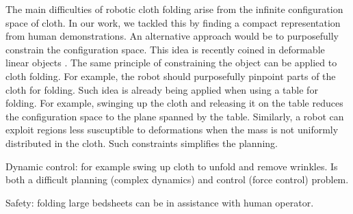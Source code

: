 \documentclass[\home/main.tex]{subfiles}
\begin{document}
The main difficulties of robotic cloth folding arise from the infinite configuration space of cloth. In our work, we tackled this by finding a compact representation from human demonstrations. An alternative approach would be to purposefully constrain the configuration space. This idea is recently coined in deformable linear objects \autocite{Zhu2020}. The same principle of constraining the object can be applied to cloth folding. For example, the robot should purposefully pinpoint parts of the cloth for folding. Such idea is already being applied when using a table for folding. For example, swinging up the cloth and releasing it on the table reduces the configuration space to the plane spanned by the table. Similarly, a robot can exploit regions less suscuptible to deformations when the mass is not uniformly distributed in the cloth. Such constraints simplifies the planning. 

Dynamic control: for example swing up cloth to unfold and remove wrinkles. Is both a difficult planning (complex dynamics) and control (force control) problem.


Safety: folding large bedsheets can be in assistance with human operator. 
\end{document}
